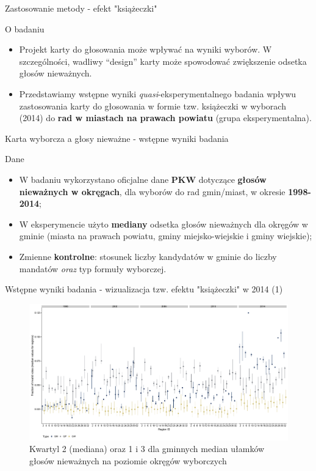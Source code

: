 \documentclass[12pt]{beamer}
\begin{document}
\begin{frame}{Zastosowanie metody - efekt "książeczki"}

\begin{block}{O badaniu}
\begin{itemize}
\item Projekt karty do głosowania może wpływać na wyniki wyborów. W szczególności, wadliwy ``design'' karty może spowodować zwiększenie odsetka głosów nieważnych.
\item Przedstawiamy wstępne wyniki \textit{quasi}-eksperymentalnego badania wpływu zastosowania karty do głosowania w formie tzw. książeczki w wyborach (2014) do \textbf{rad w miastach na prawach powiatu} (grupa eksperymentalna).
\end{itemize}
\end{block}

\end{frame}

\begin{frame}{Karta wyborcza a głosy nieważne - wstępne wyniki badania}
    
\begin{block}{Dane}
\begin{itemize}
\item W badaniu wykorzystano oficjalne dane \textbf{PKW} dotyczące \textbf{głosów nieważnych w okręgach}, dla wyborów do rad gmin/miast, w okresie \textbf{1998-2014};
\item W eksperymencie użyto \textbf{mediany} odsetka głosów nieważnych dla okręgów w gminie (miasta na prawach powiatu, gminy miejsko-wiejskie i gminy wiejskie);
\item Zmienne \textbf{kontrolne}: stosunek liczby kandydatów w gminie do liczby mandatów \textit{oraz} typ formuły wyborczej.
\end{itemize}
\end{block}
    
\end{frame}

\begin{frame}{Wstępne wyniki badania - wizualizacja tzw. efektu "książeczki" w 2014 (1)}
    
\begin{figure}
\includegraphics[scale=0.2]{inv_medians.pdf}
\caption{\label{fig:did}Kwartyl 2 (mediana) oraz 1 i 3 dla gminnych median ułamków głosów nieważnych na poziomie okręgów wyborczych}
\end{figure}
    
\end{frame}
\end{document}
